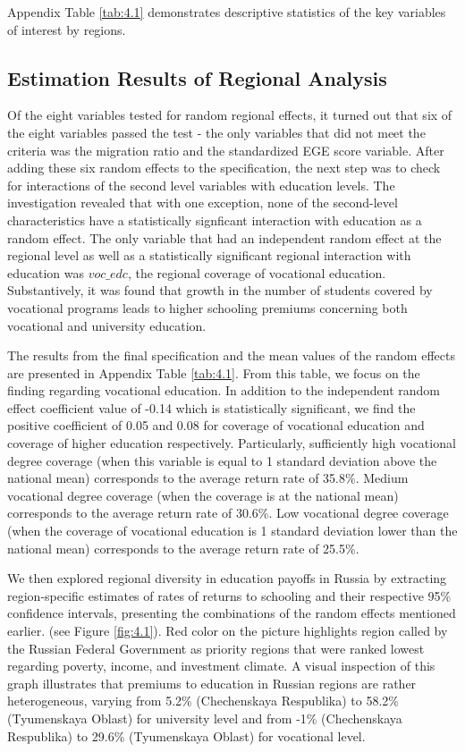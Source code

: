 \documentclass[alpha-refs]{wiley-article-03v}
\begin{document}
Appendix Table \ref{tab:4.1} demonstrates descriptive statistics of the key variables of interest by regions.

\subsection{Estimation Results of Regional Analysis}

Of the eight variables tested for random regional effects, it turned out that six of the eight variables passed the test - the only variables that did not meet the criteria was the migration ratio and the standardized EGE score variable. After adding these six random effects to the specification, the next step was to check for interactions of the second level variables with education levels. The investigation revealed that with one exception, none of the second-level characteristics have a statistically signficant interaction with education as a random effect. The only variable that had an independent random effect at the regional level as well as a statistically significant regional interaction with education was $voc\_edc$, the regional coverage of vocational education. Substantively, it was found that growth in the number of students covered by vocational programs leads to higher schooling premiums concerning both vocational and university education. 

The results from the final specification and the mean values of the random effects are presented in Appendix Table \ref{tab:4.1}. From this table, we focus on the finding regarding vocational education. In addition to the independent random effect coefficient value of -0.14 which is statistically significant, we find the positive coefficient of 0.05 and 0.08 for coverage of vocational education and coverage of higher education respectively.  Particularly, sufficiently high vocational degree coverage (when this variable is equal to 1 standard deviation above the national mean) corresponds to the average return rate of 35.8\%. Medium vocational degree coverage (when the coverage is at the national mean) corresponds to the average return rate of 30.6\%. Low vocational degree coverage (when the coverage of vocational education is 1 standard deviation lower than the national mean) corresponds to the average return rate of 25.5\%. 


We then explored regional diversity in education payoffs in Russia by extracting region-specific estimates of rates of returns to schooling and their respective 95\% confidence intervals, presenting the combinations of the random effects mentioned earlier. (see Figure \ref{fig:4.1}). Red color on the picture highlights region called by the Russian Federal Government as priority regions that were ranked lowest regarding poverty, income, and investment climate. A visual inspection of this graph illustrates that premiums to education in Russian regions are rather heterogeneous, varying from 5.2\% (Chechenskaya Respublika) to 58.2\% (Tyumenskaya Oblast) for university level and from -1\% (Chechenskaya Respublika) to 29.6\% (Tyumenskaya Oblast) for vocational level.
\end{document}

